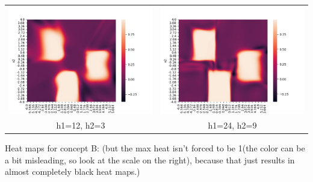 \documentclass[twoside]{article}
\begin{document}
\begin{tabular}{ cc }
	\includegraphics[scale=0.5]{heatmaps1/A1c_12_3} & \includegraphics[scale=0.5]{heatmaps1/A1c_24_9} \\ 
	h1=12, h2=3 & h1=24, h2=9 \\ 
\end{tabular}

Heat maps for concept B: (but the max heat isn't forced to be 1(the color can be a bit misleading, so look at the scale on the right), because that just results in almost completely black heat maps.)\\
\end{document}
